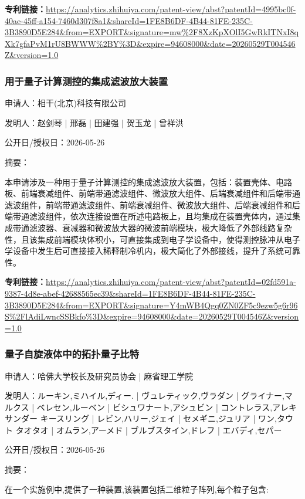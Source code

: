 \documentclass[12pt,a4paper]{ctexart}
\begin{document}
\noindent\textbf{专利链接：}\url{https://analytics.zhihuiya.com/patent-view/abst?patentId=4995bc0f-40ae-45ff-a154-7460d307f8a1&shareId=1FE8B6DF-4B44-81FE-235C-3B3890D5E284&from=EXPORT&signature=mw%2F8XzKpXOlI5GwRkITNxI8qXk7gfaPvM1rU8BWWW%2BY%3D&expire=94608000&date=20260529T004546Z&version=1.0}

\subsubsection{ 用于量子计算测控的集成滤波放大装置 }

申请人：相干(北京)科技有限公司

发明人：赵剑琴 | 邢磊 | 田建强 | 贺玉龙 | 曾祥洪

公开日/授权日：2026-05-26

摘要：

本申请涉及一种用于量子计算测控的集成滤波放大装置，包括：装置壳体、电路板、前端衰减组件、前端带通滤波组件、微波放大组件、后端衰减组件和后端带通滤波组件，前端带通滤波组件、前端衰减组件、微波放大组件、后端衰减组件和后端带通滤波组件，依次连接设置在所述电路板上，且均集成在装置壳体内，通过集成带通滤波器、衰减器和微波放大器的微波前端模块，极大降低了外部线路复杂性，且该集成前端模块体积小，可直接集成到电子学设备中，使得测控脉冲从电子学设备中发生后可直接接入稀释制冷机内，极大简化了外部接线，提升了系统可靠性。

\noindent\textbf{专利链接：}\url{https://analytics.zhihuiya.com/patent-view/abst?patentId=02fd591a-9387-4d8e-abef-42688565ec39&shareId=1FE8B6DF-4B44-81FE-235C-3B3890D5E284&from=EXPORT&signature=Y4mWB4Qgq0ZN0ZF5c9ezw5g6r96S%2FlAdiLwncSSBkfo%3D&expire=94608000&date=20260529T004546Z&version=1.0}

\subsubsection{ 量子自旋液体中的拓扑量子比特 }

申请人：哈佛大学校长及研究员协会 | 麻省理工学院

发明人：ルーキン,ミハイル,ディー. | ヴュレティック,ヴラダン | グライナー,マルクス | ベレセン,ルーベン | ビシュワナート,アシュビン | コントレラス,アレキサンダー キースリング | レビン,ハリー,ジェイ | セメギニ,ジュリア | ワン,タウト タオタオ | オムラン,アーメド | ブルブスタイン,ドレフ | エバディ,セパー

公开日/授权日：2026-05-26

摘要：

在一个实施例中,提供了一种装置,该装置包括二维粒子阵列,每个粒子包含: 
\end{document}
